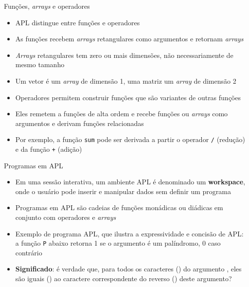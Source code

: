 \begin{frame}[fragile]{Funções, \textit{arrays} e operadores}

    \begin{itemize}
        \item APL distingue entre funções e operadores
        \pause

        \item As funções recebem \textit{arrays} retangulares como argumentos e retornam \textit{arrays}
        \pause

        \item \textit{Arrays} retangulares tem zero ou mais dimensões, não necessariamente de mesmo tamanho
        \pause

        \item Um vetor é um \textit{array} de dimensão 1, uma matriz um \textit{array} de dimensão 2
        \pause

        \item Operadores permitem construir funções que são variantes de outras funções
        \pause

        \item Eles remetem a funções de alta ordem e recebe funções ou \textit{arrays} como argumentos e derivam funções relacionadas
        \pause

        \item Por exemplo, a função \texttt{sum} pode ser derivada a partir o operador \texttt{/} (redução) e da função \texttt{+} (adição)

    \end{itemize}

\end{frame}

\begin{frame}[fragile]{Programas em APL}

    \begin{itemize}
        \item Em uma sessão interativa, um ambiente APL é denominado um \textbf{workspace}, onde o usuário pode inserir e manipular dados sem definir um programa
        \pause

        \item Programas em APL são cadeias de funções monádicas ou diádicas em conjunto com operadores e \textit{arrays}
        \pause

        \item Exemplo de programa APL, que ilustra a expressividade e concisão de APL: a função \texttt{P} abaixo retorna 1 se o argumento é um palíndromo, 0 caso contrário

        \pause

        \item \textbf{Significado}: é verdade que, para todos os caracteres () do argumento , eles são iguais () ao caractere correspondente do reverso () deste argumento?
    \end{itemize}

\end{frame}
